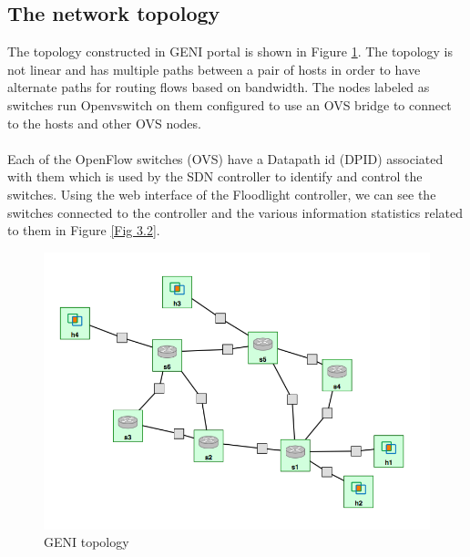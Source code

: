 \documentclass[paper=a4, fontsize=12pt]{scrartcl}	%
\numberwithin{equation}{section}		%
\numberwithin{figure}{section}			%
\numberwithin{table}{section}				%
\begin{document}
\subsection{The network topology}
The topology constructed in GENI portal is shown in Figure \ref{Fig 3.1}. The topology is not linear and has multiple paths between a pair of hosts in order to have alternate paths for routing flows based on bandwidth. The nodes labeled as switches run Openvswitch on them configured to use an OVS bridge to connect to the hosts and other OVS nodes.
\\
\\
Each of the OpenFlow switches (OVS) have a Datapath id (DPID) associated with them which is used by the SDN controller to identify and control the switches. Using the web interface of the Floodlight controller, we can see the switches connected to the controller and the various information statistics related to them in Figure \ref{Fig 3.2}.
\begin{figure}[H]
\begin{center}
\includegraphics[scale=0.55]{topology.png}   
\end{center}
 \caption{GENI topology}
 \label{Fig 3.1}
\end{figure}
\end{document}
